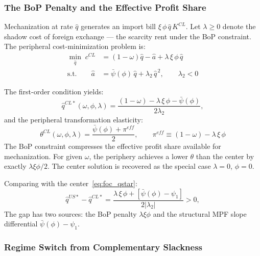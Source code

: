 \subsubsection{The BoP Penalty and the Effective Profit Share}
\label{subsec:chile_bop_penalty}

Mechanization at rate $\hat{q}$ generates an import bill
$\xi\,\phi\,\hat{q}\,K^{CL}$. Let $\lambda \geq 0$ denote the
shadow cost of foreign exchange --- the scarcity rent under the
BoP constraint. The peripheral cost-minimization problem is:
%
\begin{align}
	\min_{\hat{q}}\; c^{CL}
	&=
	(1-\omega)\hat{q}
	-
	\hat{a}
	+
	\lambda\,\xi\,\phi\,\hat{q}
	\label{eq:cl:cost_min}
	\\[4pt]
	\text{s.t.}\qquad
	\hat{a}
	&=
	\bar{\psi}(\phi)\,\hat{q}
	+
	\lambda_2\,\hat{q}^{\,2},
	\qquad
	\lambda_2<0
	\label{eq:cl:mpf_constraint}
\end{align}

%


The first-order condition yields:
%
\begin{equation}
	\hat{q}^{CL*}(\omega,\phi,\lambda)
	=
	\frac{(1-\omega)-\lambda\,\xi\,\phi-\bar{\psi}(\phi)}
	{2\lambda_2},
	\label{eq:cl:foc_qstar}
\end{equation}
%
and the peripheral transformation elasticity:
%
\begin{equation}
	\boxed{
		\theta^{CL}(\omega,\phi,\lambda)
		=
		\frac{\bar{\psi}(\phi)+\pi^{eff}}{2},
		\qquad
		\pi^{eff}
		\equiv
		(1-\omega)-\lambda\,\xi\,\phi
	}
	\label{eq:cl:theta}
\end{equation}
%
The BoP constraint compresses the effective profit share available for
mechanization. For given $\omega$, the periphery achieves a lower
$\theta$ than the center by exactly $\lambda\xi\phi/2$. The
center solution is recovered as the special case $\lambda = 0$,
$\phi = 0$.

Comparing with the center~\eqref{eq:foc_qstar}:
%
\begin{equation}
	\hat{q}^{US*} - \hat{q}^{CL*}
	=
	\frac{
		\lambda\,\xi\,\phi
		+
		\left[\bar{\psi}(\phi)-\psi_1\right]
	}{
		2|\lambda_2|
	}
	>
	0,
	\label{eq:cl:q_gap}
\end{equation}
%
The gap has two sources: the BoP penalty $\lambda\xi\phi$ and the
structural MPF slope differential
$\bar{\psi}(\phi)-\psi_1$.

\subsubsection{Regime Switch from Complementary Slackness}
\label{subsec:chile_regimes}

